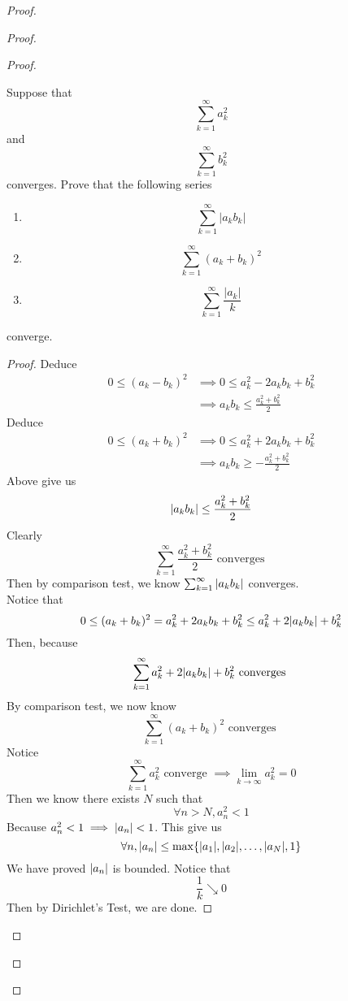 \documentclass{report}
\begin{document}
\begin{proof}
\begin{proof}
\begin{proof}
\begin{question}{}{}
Suppose that 
\[
\sum_{k=1}^{\infty} a_k^2
\]
and 
\[
\sum_{k=1}^{\infty} b_k^2
\]
converges. Prove that the following series
\begin{enumerate}
    \item \[
    \sum_{k=1}^{\infty} |a_kb_k|
    \]
    \item \[
    \sum_{k=1}^{\infty} (a_k + b_k)^2
    \]
    \item \[
    \sum_{k=1}^{\infty} \frac{|a_k|}{k}
    \]
\end{enumerate}
converge.
\end{question}
\begin{proof}
Deduce 
\begin{align}
  0\leq (a_k-b_k)^{2}&\implies 0\leq a_k^2-2a_kb_k+b_k^2\\
  &\implies a_kb_k\leq \frac{a_k^2+b_k^2}{2}
\end{align}
Deduce
\begin{align}
  0\leq (a_k+b_k)^2&\implies 0\leq a_k^2+2a_kb_k+b_k^2\\
&\implies a_kb_k\geq  -\frac{a_k^2+b_k^2}{2}
\end{align}
Above give us
\begin{equation}
|a_kb_k|\leq \frac{a_k^2+b_k^2}{2}
\end{equation}
Clearly
\begin{equation}
\sum_{k=1}^\infty \frac{a_k^2+b_k^2}{2}\text{ converges }
\end{equation}
Then by comparison test, we know $\sum_{k=1}^\infty |a_kb_k|$ converges.\\

Notice that
\begin{equation}
  0\leq (a_k+b_k)^2=a_k^2 +2a_kb_k+b_k^2 \leq a_k^2+2|a_kb_k|+b_k^2 
\end{equation}
Then, because 
\begin{equation}
\sum_{k=1}^\infty a_k^2 +2|a_kb_k|+b_k^2\text{ converges }
\end{equation}
By comparison test, we now know 
\begin{equation}
\sum_{k=1}^\infty (a_k+b_k)^2 \text{ converges }
\end{equation}
Notice
\begin{equation}
\sum_{k=1}^\infty a_k^2\text{ converge }\implies \lim_{k\to\infty}a_k^2=0
\end{equation}
Then we know there exists $N$ such that
 \begin{equation}
\forall n>N, a_n^2<1
\end{equation}
Because $a_n^2<1\implies |a_n|<1$. This give us
\begin{equation}
\forall n, |a_n|\leq \max \{ |a_1|,|a_2|,\dots ,|a_N|,1 \}
\end{equation}
We have proved $|a_n|$ is bounded. Notice that 
\begin{equation}
\frac{1}{k}\searrow 0
\end{equation}
Then by Dirichlet's Test, we are done.


\end{proof}
\end{proof}
\end{proof}
\end{proof}
\end{document}
